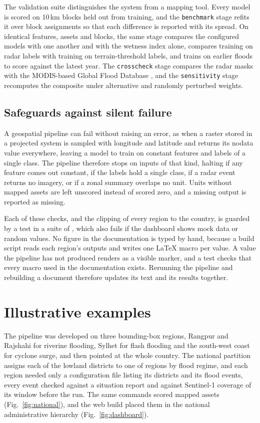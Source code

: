 \documentclass[preprint,12pt]{elsarticle}
\begin{document}
The validation suite distinguishes the system from a mapping tool. Every model is scored on 10\,km blocks held out from training, and the \texttt{benchmark} stage refits it over \RRBenchSeeds{} block assignments so that each difference is reported with its spread. On identical features, assets and blocks, the same stage compares the configured models with one another and with the wetness index alone, compares training on radar labels with training on terrain-threshold labels, and trains on earlier floods to score against the latest year. The \texttt{crosscheck} stage compares the radar masks with the MODIS-based Global Flood Database \citep{tellman2021}, and the \texttt{sensitivity} stage recomputes the composite under alternative and randomly perturbed weights.

\subsection{Safeguards against silent failure}

A geospatial pipeline can fail without raising an error, as when a raster stored in a projected system is sampled with longitude and latitude and returns its nodata value everywhere, leaving a model to train on constant features and labels of a single class. The pipeline therefore stops on inputs of that kind, halting if any feature comes out constant, if the labels hold a single class, if a radar event returns no imagery, or if a zonal summary overlaps no unit. Units without mapped assets are left unscored instead of scored zero, and a missing output is reported as missing.

Each of these checks, and the clipping of every region to the country, is guarded by a test in a suite of \NatTests{}, which also fails if the dashboard shows mock data or random values. No figure in the documentation is typed by hand, because a build script reads each region's outputs and writes one LaTeX macro per value. A value the pipeline has not produced renders as a visible marker, and a test checks that every macro used in the documentation exists. Rerunning the pipeline and rebuilding a document therefore updates its text and its results together.

\section{Illustrative examples}

The pipeline was developed on three bounding-box regions, Rangpur and Rajshahi for riverine flooding, Sylhet for flash flooding and the south-west coast for cyclone surge, and then pointed at the whole country. The national partition assigns each of the \NatDistricts{} lowland districts to one of \NatRegions{} regions by flood regime, and each region needed only a configuration file listing its districts and its flood events, every event checked against a situation report and against Sentinel-1 coverage of its window before the run. The same commands scored \NatAssets{} mapped assets (Fig.~\ref{fig:national}), and the web build placed them in the national administrative hierarchy (Fig.~\ref{fig:dashboard}).
\end{document}

